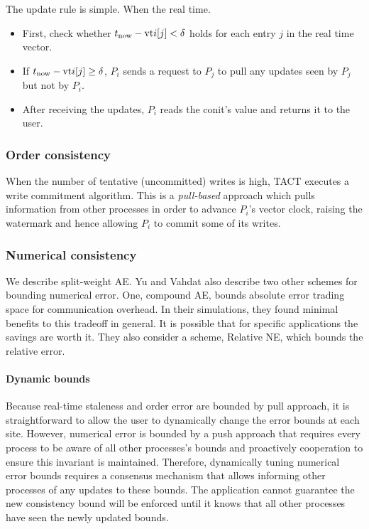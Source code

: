 \documentclass[]             %
{NASA}                       %
\theoremstyle{definition}
\begin{document}
The update rule is simple. When the real time.

\newcommand{\vtphys}[2]{\mathrm{vt}_{#1}}
\begin{itemize}
\item First, check whether $t_{\mathrm{now}} - \textrm{vt}{i}[j] < \delta$
  holds for each entry $j$ in the real time vector.
\item If $t_{\mathrm{now}} - \textrm{vt}{i}[j] \geq \delta$, $P_i$ sends a
  request to $P_j$ to pull any updates seen by $P_j$ but not by $P_i$.
\item After receiving the updates, $P_i$ reads the conit's value and
  returns it to the user.
\end{itemize}

\subsubsection{Order consistency}
\label{order-consistency}
When the number of tentative (uncommitted) writes is high, TACT
executes a write commitment algorithm. This is a \emph{pull-based}
approach which pulls information from other processes in order to
advance \(P_i\)'s vector clock, raising the watermark and hence
allowing \(P_i\) to commit some of its writes.

\subsubsection{Numerical consistency}
\label{numerical-consistency}

We describe split-weight AE. Yu and Vahdat also describe two other
schemes for bounding numerical error. One, compound AE, bounds absolute
error trading space for communication overhead. In their simulations,
they found minimal benefits to this tradeoff in general. It is possible
that for specific applications the savings are worth it. They also
consider a scheme, Relative NE, which bounds the relative error.


\paragraph{Dynamic bounds}
Because real-time staleness and order error are bounded by pull
approach, it is straightforward to allow the user to dynamically
change the error bounds at each site. However, numerical error is
bounded by a push approach that requires every process to be aware of
all other processes's bounds and proactively cooperation to ensure
this invariant is maintained. Therefore, dynamically tuning numerical
error bounds requires a consensus mechanism that allows informing
other processes of any updates to these bounds. The application cannot
guarantee the new consistency bound will be enforced until it knows
that all other processes have seen the newly updated bounds.
\end{document}
